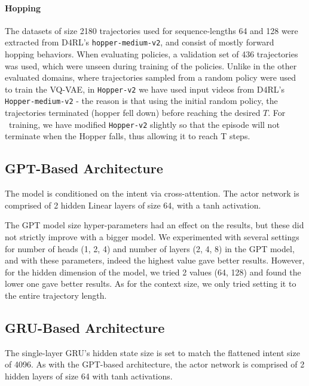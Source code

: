 \documentclass[nohyperref]{article}
\begin{document}
\paragraph{Hopping}
The datasets of size 2180 trajectories used for sequence-lengths 64 and 128 were extracted from D4RL's \texttt{hopper-medium-v2}, and consist of mostly forward hopping behaviors. When evaluating policies, a validation set of 436 trajectories was used, which were unseen during training of the policies. Unlike in the other evaluated domains, where trajectories sampled from a random policy were used to train the VQ-VAE, in \texttt{Hopper-v2} we have used input videos from D4RL's \texttt{Hopper-medium-v2} - the reason is that using the initial random policy, the trajectories terminated (hopper fell down) before reaching the desired $T$. For \methodname\ training, we have modified \texttt{Hopper-v2} slightly so that the episode will not terminate when the Hopper falls, thus allowing it to reach T steps. 


\subsection{GPT-Based Architecture}
\label{app:gpt}
The model is conditioned on the intent via cross-attention. The actor network is comprised of 2  hidden Linear layers of size 64, with a tanh activation.

The GPT model size hyper-parameters had an effect on the results, but these did not strictly improve with a bigger model. We experimented with several settings for number of heads (1, 2, 4) and number of layers (2, 4, 8) in the GPT model, and with these parameters, indeed the highest value gave better results. However, for the hidden dimension of the model, we tried 2 values (64, 128) and found the lower one gave better results. As for the context size, we only tried setting it to the entire trajectory length.


\subsection{GRU-Based Architecture}
\label{app:gru}
The single-layer GRU's hidden state size is set to match the flattened intent size of 4096. As with the GPT-based architecture, the actor network is comprised of 2 hidden layers of size 64 with tanh activations. 
\end{document}
